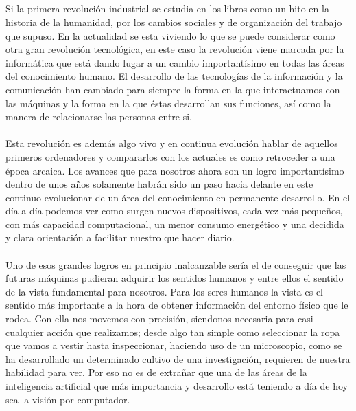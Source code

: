 \documentclass[a4paper,12pt,titlepage,final]{book}
\begin{document}
\subsection*{}
\subsubsection*{}

\paragraph{}
Si la primera revolución industrial se estudia en los libros como un hito en la
historia de la humanidad, por los cambios sociales y de organización del trabajo
que supuso. En la actualidad se esta viviendo lo que se puede considerar como
otra gran revolución tecnológica, en este caso la revolución viene marcada por
la informática que está dando lugar a un cambio importantísimo en todas las
áreas del conocimiento humano. El desarrollo de las tecnologías de la
información y la comunicación han cambiado para siempre la forma en la que
interactuamos con las máquinas y la forma en la que éstas desarrollan sus
funciones, así como la manera de relacionarse las personas entre si.

\paragraph{}
Esta revolución es además algo vivo y en continua evolución hablar de aquellos
primeros ordenadores y compararlos con los actuales es como retroceder a una
época arcaica. Los avances que para nosotros ahora son un logro importantísimo
dentro de unos años solamente habrán sido un paso hacia delante en este continuo
evolucionar de un área del conocimiento en permanente desarrollo. En el día a
día podemos ver como surgen nuevos dispositivos, cada vez más pequeños, con más
capacidad computacional, un menor consumo energético y una decidida y clara
orientación a facilitar nuestro que hacer diario.

\paragraph{}
Uno de esos grandes logros en principio inalcanzable sería el de conseguir que
las futuras máquinas pudieran adquirir los sentidos humanos y entre ellos el
sentido de la vista fundamental para nosotros. Para los seres humanos la vista
es el sentido más importante a la hora de obtener información del entorno físico
que le rodea. Con ella nos movemos con precisión, siendonos necesaria para casi
cualquier acción que realizamos; desde algo tan simple como seleccionar la ropa
que vamos a vestir hasta inspeccionar, haciendo uso de un microscopio, como se
ha desarrollado un determinado cultivo de una investigación, requieren de
nuestra habilidad para ver. Por eso no es de extrañar que una de las áreas de la
inteligencia artificial que más importancia y desarrollo está teniendo a día de
hoy sea la visión por computador.
\end{document}

